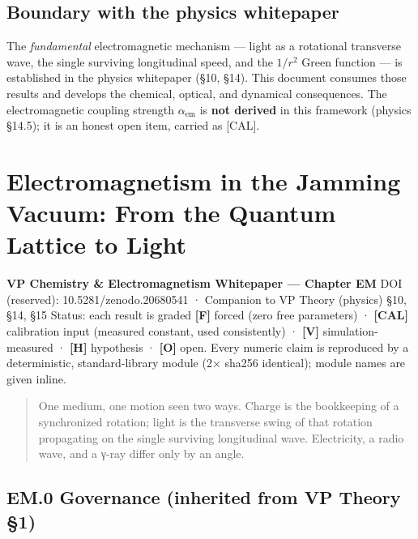 \documentclass[
  10pt,
]{article}
\begin{document}
\hypertarget{boundary-with-the-physics-whitepaper}{%
\subsection{Boundary with the physics
whitepaper}\label{boundary-with-the-physics-whitepaper}}

The \emph{fundamental} electromagnetic mechanism --- light as a
rotational transverse wave, the single surviving longitudinal speed, and
the \(1/r^2\) Green function --- is established in the physics
whitepaper (§10, §14). This document consumes those results and develops
the chemical, optical, and dynamical consequences. The electromagnetic
coupling strength \(\alpha_{\mathrm{em}}\) is \textbf{not derived} in
this framework (physics §14.5); it is an honest open item, carried as
{[}CAL{]}.

\newpage

\hypertarget{electromagnetism-in-the-jamming-vacuum-from-the-quantum-lattice-to-light}{%
\section{Electromagnetism in the Jamming Vacuum: From the Quantum
Lattice to
Light}\label{electromagnetism-in-the-jamming-vacuum-from-the-quantum-lattice-to-light}}

\textbf{VP Chemistry \& Electromagnetism Whitepaper --- Chapter EM} DOI
(reserved): 10.5281/zenodo.20680541 · Companion to VP Theory (physics)
§10, §14, §15 Status: each result is graded \textbf{{[}F{]}} forced
(zero free parameters) · \textbf{{[}CAL{]}} calibration input (measured
constant, used consistently) · \textbf{{[}V{]}} simulation-measured ·
\textbf{{[}H{]}} hypothesis · \textbf{{[}O{]}} open. Every numeric claim
is reproduced by a deterministic, standard-library module (2× sha256
identical); module names are given inline.

\begin{quote}
One medium, one motion seen two ways. Charge is the bookkeeping of a
synchronized rotation; light is the transverse swing of that rotation
propagating on the single surviving longitudinal wave. Electricity, a
radio wave, and a γ-ray differ only by an angle.
\end{quote}

\hypertarget{em.0-governance-inherited-from-vp-theory-1}{%
\subsection{EM.0 Governance (inherited from VP Theory
§1)}\label{em.0-governance-inherited-from-vp-theory-1}}
\end{document}
